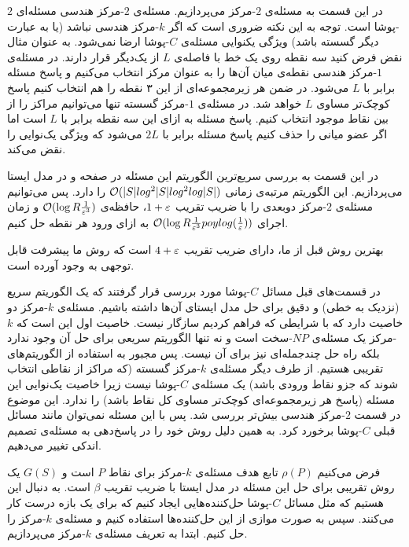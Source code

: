 در این قسمت به مسئله‌ی $2$-مرکز می‌پردازیم. مسئله‌ی $2$-مرکز  هندسی مسئله‌ای $2$-پوشا است.  توجه به این نکته ضروری است که اگر $k$-مرکز هندسی نباشد (یا به عبارت دیگر گسسته باشد) ویژگی یکنوایی مسئله‌ی $C$-پوشا ارضا نمی‌شود. به عنوان مثال نقض فرض کنید سه نقطه روی یک خط با فاصله‌ی $L$ از یک‌دیگر قرار دارند. در مسئله‌ی $1$-مرکز هندسی   نقطه‌ی میان آن‌ها را به عنوان مرکز انتخاب می‌کنیم و پاسخ مسئله برابر با $L$ می‌شود.  در ضمن هر زیر‌مجموعه‌ای از این ۳ نقطه را هم انتخاب کنیم پاسخ کوچک‌تر مساوی $L$ خواهد شد. در مسئله‌ی $1$-مرکز گسسته تنها می‌توانیم مراکز را از بین نقاط موجود انتخاب کنیم. پاسخ مسئله به ازای این سه نقطه برابر با $L$ است اما اگر عضو میانی را حذف کنیم پاسخ مسئله برابر با $2L$ می‌شود که ویژگی یک‌نوایی را نقض می‌کند. 

در این قسمت به بررسی سریع‌ترین الگوریتم این مسئله در صفحه و در مدل ایستا می‌پردازیم. این الگوریتم مرتبه‌ی زمانی 
$ \mathcal{O}(|S| log^2 |S| log ^2 log |S|)$
را دارد. پس می‌توانیم مسئله‌ی $2$-مرکز دوبعدی را با ضریب تقریب $1+\varepsilon$، حافظه‌ی 
$ \mathcal{O}(\log R \frac{1}{\varepsilon^{3}})$
و زمان اجرای
$ \mathcal{O}(\log R \frac{1}{\varepsilon^3} poylog(\frac{1}{\varepsilon}))$
به ازای ورود هر نقطه حل کنیم.

بهترین روش قبل از ما، دارای ضریب تقریب $4+\varepsilon$ است  که روش ما پیشرفت قابل توجهی به وجود آورده است.

در قسمت‌های قبل مسائل $C$-پوشا مورد بررسی قرار گرفتند که یک الگوریتم سریع (نزدیک به خطی) و دقیق برای حل مدل ایستای آن‌ها داشته باشیم. مسئله‌ی $k$-مرکز دو خاصیت دارد که با شرایطی که فراهم کردیم سازگار نیست. خاصیت اول این است که $k$-مرکز یک مسئله‌‌ی $NP$-سخت است و نه تنها الگوریتم سریعی برای حل آن وجود ندارد بلکه راه حل چندجمله‌ای نیز برای آن نیست. پس مجبور به استفاده از الگوریتم‌های تقریبی هستیم. از طرف دیگر مسئله‌ی $k$-مرکز گسسته (که مراکز از نقاطی انتخاب شوند که جزو نقاط ورودی باشد) یک مسئله‌ی $C$-پوشا نیست زیرا خاصیت یک‌نوایی این مسئله (پاسخ هر زیرمجموعه‌ای کوچک‌تر مساوی کل نقاط باشد) را ندارد. این موضوع در قسمت $2$-مرکز هندسی  بیش‌تر بررسی شد. پس با این مسئله نمی‌توان مانند مسائل قبلی  $C$-پوشا برخورد کرد. به همین دلیل روش خود را در پاسخ‌دهی به مسئله‌ی تصمیم اندکی تغییر می‌دهیم.

فرض می‌کنیم $\rho(P)$ تابع هدف مسئله‌ی $k$-مرکز برای نقاط $P$ است و $G(S)$ یک روش تقریبی برای حل این مسئله در مدل ایستا با ضریب تقریب $\beta$ است. به دنبال این هستیم که مثل مسائل $C$-پوشا حل‌کننده‌هایی ایجاد کنیم که برای یک بازه درست کار می‌کنند. سپس به صورت موازی از این حل‌کننده‌ها استفاده کنیم و مسئله‌ی $k$-مرکز را حل کنیم. ابتدا به تعریف مسئله‌ی $k$-مرکز می‌پردازیم.

